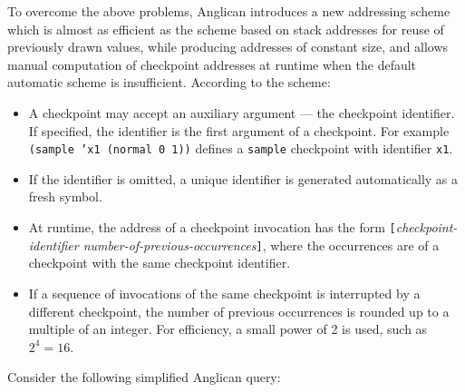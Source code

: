 \documentclass[preprint]{sigplanconf}
\begin{document}
To overcome the above problems, Anglican introduces a new
addressing scheme which is almost as efficient as the scheme
based on stack addresses for reuse of previously drawn values,
while producing addresses of constant size, and allows manual
computation of checkpoint addresses at runtime when the default
automatic scheme is insufficient. According to the scheme:
\begin{itemize}
    \item A checkpoint may accept an auxiliary argument --- the
        checkpoint identifier. If specified, the identifier is the first
        argument of a checkpoint. For example \texttt{(sample
        'x1  (normal 0 1))} defines a \texttt{sample} checkpoint
        with identifier \texttt{x1}.
    \item If the identifier is omitted, a unique identifier is
        generated automatically as a fresh symbol.
    \item At runtime, the address of a checkpoint invocation has
        the form
        \texttt{[}\textit{checkpoint-identifier
        number-of-previous-occurrences}\texttt{]}, where the
        occurrences are of a checkpoint with the same checkpoint
        identifier.
    \item If a sequence of invocations of the same checkpoint is
        interrupted by a different checkpoint, the number of
        previous occurrences is rounded up to a multiple of
        an integer. For efficiency, a small power of 2 is used,
        such as $2^4 = 16$.
\end{itemize}

\noindent Consider the following simplified Anglican query:
\end{document}
